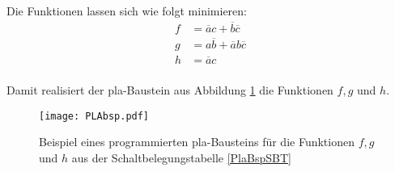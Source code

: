 Die Funktionen lassen sich wie folgt minimieren:
\begin{align*}
 f &= \overline{a}c + \overline{b}\overline{c} \\
 g &= a\overline{b} + \overline{a}b\overline{c} \\
 h &= \overline{a}c \\
\end{align*}

Damit realisiert der {\sc pla}-Baustein aus Abbildung \ref{plaBeispiel} die Funktionen $f, g$ und $h$.
\begin{figure}[htp]
	\centering
	\texttt{[image: PLAbsp.pdf]}
	\caption{Beispiel eines programmierten {\sc pla}-Bausteins für die Funktionen $f, g$ und $h$ aus der Schaltbelegungstabelle \ref{PlaBspSBT}}
	\label{plaBeispiel}
\end{figure}

  




% 